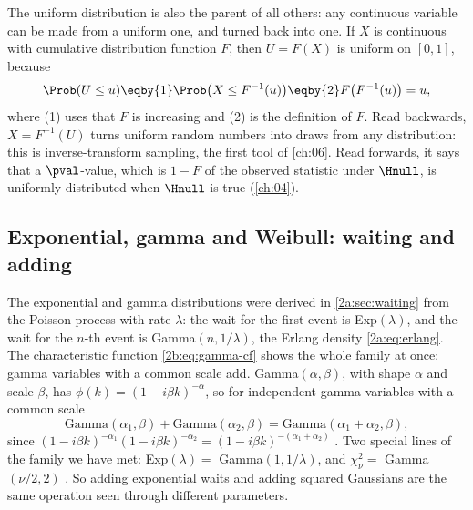 The uniform distribution is also the parent of all others: any continuous variable can be made from a uniform one, and turned back into one. If $X$ is continuous with cumulative distribution function $F$, then $U=F(X)$ is uniform on $[0,1]$, because
\[
  \Prob(U\le u)\eqby{1}\Prob\bigl(X\le F^{-1}(u)\bigr)\eqby{2}F\bigl(F^{-1}(u)\bigr)=u ,
\]
where (1) uses that $F$ is increasing and (2) is the definition of $F$. Read backwards, $X=F^{-1}(U)$ turns uniform random numbers into draws from any distribution: this is inverse-transform sampling, the first tool of \cref{ch:06}. Read forwards, it says that a $\pval$-value, which is $1-F$ of the observed statistic under $\Hnull$, is uniformly distributed when $\Hnull$ is true (\cref{ch:04}).

\subsection{Exponential, gamma and Weibull: waiting and adding}
\label{2b:sec:gamma}

The exponential and gamma distributions were derived in \cref{2a:sec:waiting} from the Poisson process with rate $\lambda$: the wait for the first event is Exp$(\lambda)$, and the wait for the $n$-th event is Gamma$(n,1/\lambda)$, the Erlang density \eqref{2a:eq:erlang}. The characteristic function \eqref{2b:eq:gamma-cf} shows the whole family at once: gamma variables with a common scale add. Gamma$(\alpha,\beta)$, with shape $\alpha$ and scale $\beta$, has $\phi(k)=(1-i\beta k)^{-\alpha}$, so for independent gamma variables with a common scale
\begin{equation}
  \mathrm{Gamma}(\alpha_1,\beta)+\mathrm{Gamma}(\alpha_2,\beta)=\mathrm{Gamma}(\alpha_1+\alpha_2,\beta),
  \label{2b:eq:gamma-add}
\end{equation}
since $(1-i\beta k)^{-\alpha_1}(1-i\beta k)^{-\alpha_2}=(1-i\beta k)^{-(\alpha_1+\alpha_2)}$ . Two special lines of the family we have met: Exp$(\lambda)=$ Gamma$(1,1/\lambda)$, and $\chi^2_\nu=$ Gamma$(\nu/2,2)$ . So adding exponential waits and adding squared Gaussians are the same operation seen through different parameters.

